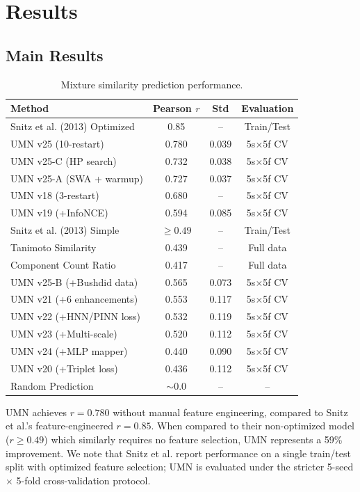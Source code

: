 \documentclass[11pt,a4paper]{article}
\begin{document}
\section{Results}

\subsection{Main Results}

\begin{table}[H]
\centering
\caption{Mixture similarity prediction performance.}
\label{tab:main}
\begin{tabular}{lccc}
\toprule
Method & Pearson $r$ & Std & Evaluation \\
\midrule
Snitz et al. (2013) Optimized & 0.85 & -- & Train/Test \\
UMN v25 (10-restart) & 0.780 & 0.039 & 5s$\times$5f CV \\
UMN v25-C (HP search) & 0.732 & 0.038 & 5s$\times$5f CV \\
UMN v25-A (SWA + warmup) & 0.727 & 0.037 & 5s$\times$5f CV \\
UMN v18 (3-restart) & 0.680 & -- & 5s$\times$5f CV \\
UMN v19 (+InfoNCE) & 0.594 & 0.085 & 5s$\times$5f CV \\
Snitz et al. (2013) Simple & $\geq 0.49$ & -- & Train/Test \\
Tanimoto Similarity & 0.439 & -- & Full data \\
Component Count Ratio & 0.417 & -- & Full data \\
UMN v25-B (+Bushdid data) & 0.565 & 0.073 & 5s$\times$5f CV \\
UMN v21 (+6 enhancements) & 0.553 & 0.117 & 5s$\times$5f CV \\
UMN v22 (+HNN/PINN loss) & 0.532 & 0.119 & 5s$\times$5f CV \\
UMN v23 (+Multi-scale) & 0.520 & 0.112 & 5s$\times$5f CV \\
UMN v24 (+MLP mapper) & 0.440 & 0.090 & 5s$\times$5f CV \\
UMN v20 (+Triplet loss) & 0.436 & 0.112 & 5s$\times$5f CV \\
Random Prediction & $\sim$0.0 & -- & -- \\
\bottomrule
\end{tabular}
\end{table}

UMN achieves $r = 0.780$ without manual feature engineering, compared to Snitz et al.'s feature-engineered $r = 0.85$. When compared to their non-optimized model ($r \geq 0.49$) which similarly requires no feature selection, UMN represents a 59\% improvement. We note that Snitz et al. report performance on a single train/test split with optimized feature selection; UMN is evaluated under the stricter 5-seed $\times$ 5-fold cross-validation protocol.
\end{document}
